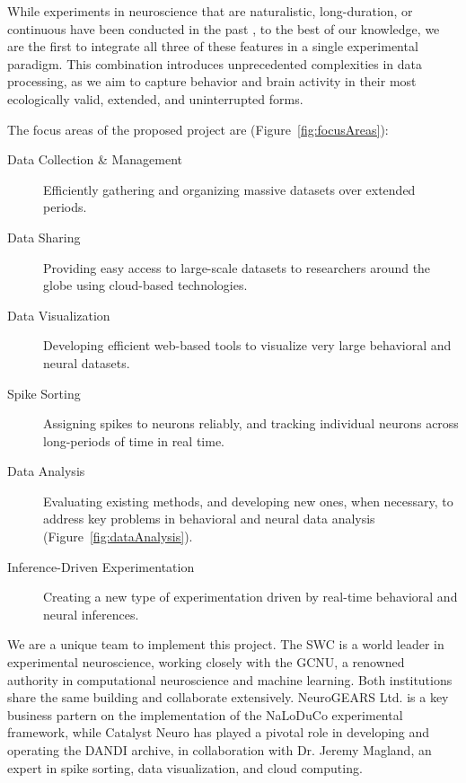 While experiments in neuroscience that are naturalistic, long-duration, or
continuous have been conducted in the past
\citep[e.g.,][]{jhuangEtAl10,maoEtAl21,volohEtAl23}, to the best of our
knowledge, we are the first to integrate all three of these features in a
single experimental paradigm.
%
This combination introduces unprecedented complexities in data processing, as
we aim to capture behavior and brain activity in their most ecologically valid,
extended, and uninterrupted forms.

The focus areas of the proposed project are (Figure~\ref{fig:focusAreas}):

\begin{description}

    \item[Data Collection \& Management] Efficiently gathering and organizing
        massive datasets over extended periods.

    \item[Data Sharing] Providing easy access to large-scale datasets
        to researchers around the globe using cloud-based technologies.

    \item[Data Visualization] Developing efficient web-based tools to visualize
        very large behavioral and neural datasets.

    \item[Spike Sorting] Assigning spikes to neurons reliably, and tracking
        individual neurons across long-periods of time in real time.

    \item[Data Analysis] Evaluating existing methods, and developing new ones,
        when necessary, to address key problems in behavioral and neural data
        analysis (Figure~\ref{fig:dataAnalysis}).

    \item[Inference-Driven Experimentation] Creating a new type of
        experimentation driven by real-time behavioral and neural inferences.

\end{description}

We are a unique team to implement this project.
%
The SWC is a world leader in experimental neuroscience, working closely with
the GCNU, a renowned authority in computational neuroscience and machine
learning. Both institutions share the same building and collaborate
extensively.
%
NeuroGEARS Ltd. is a key business partern on the implementation of the NaLoDuCo
experimental framework,
%
while Catalyst Neuro has played a pivotal role in developing and operating the
DANDI archive,
%
in collaboration with Dr. Jeremy Magland, an expert in spike sorting, data
visualization, and cloud computing.

